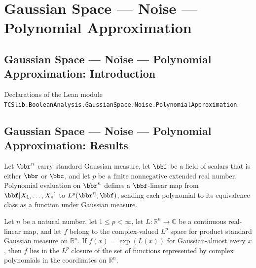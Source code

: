 \section{Gaussian Space --- Noise --- Polynomial Approximation}
\subsection*{Gaussian Space --- Noise --- Polynomial Approximation: Introduction}

Declarations of the Lean module \texttt{TCSlib.BooleanAnalysis.GaussianSpace.Noise.PolynomialApproximation}.

\subsection*{Gaussian Space --- Noise --- Polynomial Approximation: Results}

\begin{definition}
\label{BooleanAnalysis.GaussianSpace.gaussianPolynomialLp}
\leanok
{}
Let $\bbr^n$ carry standard Gaussian measure, let $\bbf$ be a field of scalars that is
either $\bbr$ or $\bbc$, and let $p$ be a finite nonnegative extended real number.
Polynomial evaluation on $\bbr^n$ defines a $\bbf$-linear map from
$\bbf[X_1,\ldots,X_n]$ to $L^p(\bbr^n,\bbf)$, sending each polynomial to its equivalence
class as a function under Gaussian measure.
\end{definition}

\begin{lemma}
\label{BooleanAnalysis.GaussianSpace.exp_linear_mem_gaussianPolynomial_closure}
\leanok
{}
Let $n$ be a natural number, let $1\le p<\infty$, let $L\colon\mathbb R^n\to\mathbb C$
be a continuous real-linear map, and let $f$ belong to the complex-valued $L^p$ space
for product standard Gaussian measure on $\mathbb R^n$. If $f(x)=\exp(L(x))$ for
Gaussian-almost every $x$, then $f$ lies in the $L^p$ closure of the set of functions
represented by complex polynomials in the coordinates on $\mathbb R^n$.
\end{lemma}

